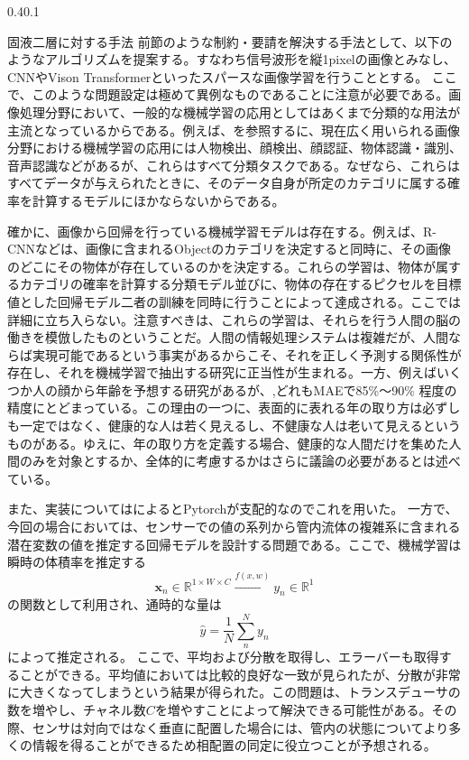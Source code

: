 \documentclass[uplatex]{suribt}
\makeatletter
\renewcommand{\subsection}{%
    \@startsection{subsection}{1}{\z@}%
    {0.4\Cvs}{0.1\Cvs}%
    {\normalfont\normalsize\headfont\raggedright}}
\makeatother
\begin{document}
\subsection{固液二層に対する手法}
前節のような制約・要請を解決する手法として、以下のようなアルゴリズムを提案する。すなわち信号波形を縦1pixelの画像とみなし、CNNやVison Transformerといったスパースな画像学習を行うこととする。
ここで、このような問題設定は極めて異例なものであることに注意が必要である。画像処理分野において、一般的な機械学習の応用としてはあくまで分類的な用法が主流となっているからである。例えば、\cite{Bishop:DeepLearning24}を参照するに、現在広く用いられる画像分野における機械学習の応用には人物検出、顔検出、顔認証、物体認識・識別、音声認識などがあるが、これらはすべて分類タスクである。なぜなら、これらはすべてデータが与えられたときに、そのデータ自身が所定のカテゴリに属する確率を計算するモデルにほかならないからである。\par
確かに、画像から回帰を行っている機械学習モデルは存在する。例えば、R-CNN\cite{girshick2014rich}などは、画像に含まれるObjectのカテゴリを決定すると同時に、その画像のどこにその物体が存在しているのかを決定する。これらの学習は、物体が属するカテゴリの確率を計算する分類モデル並びに、物体の存在するピクセルを目標値とした回帰モデル二者の訓練を同時に行うことによって達成される。ここでは詳細に立ち入らない。注意すべきは、これらの学習は、それらを行う人間の脳の働きを模倣したものということだ。人間の情報処理システムは複雑だが、人間ならば実現可能であるという事実があるからこそ、それを正しく予測する関係性が存在し、それを機械学習で抽出する研究に正当性が生まれる。一方、例えばいくつか人の顔から年齢を予想する研究があるが、\cite{sheoran2020age},\cite{guo2008probabilistic}どれもMAEで85\%～90\% 程度の精度にとどまっている。この理由の一つに、表面的に表れる年の取り方は必ずしも一定ではなく、健康的な人は若く見えるし、不健康な人は老いて見えるというものがある。ゆえに、年の取り方を定義する場合、健康的な人間だけを集めた人間のみを対象とするか、全体的に考慮するかはさらに議論の必要があると\cite{guo2008probabilistic}は述べている。\par
また、実装については\cite{torchvstensor}によるとPytorchが支配的なのでこれを用いた。
一方で、今回の場合においては、センサーでの値の系列から管内流体の複雑系に含まれる潜在変数の値を推定する回帰モデルを設計する問題である。ここで、機械学習は瞬時の体積率を推定する
\begin{equation}
    \mathbf{x}_n \in \mathbb{R}^{1\times W\times C} \stackrel{f(x,w)}{\to} y_n \in \mathbb{R}^1
\end{equation}
の関数として利用され、通時的な量は
\begin{equation}
    \hat y = \frac{1}{N}\sum_n^N y_n
\end{equation}
によって推定される。
ここで、平均および分散を取得し、エラーバーも取得することができる。平均値においては比較的良好な一致が見られたが、分散が非常に大きくなってしまうという結果が得られた。この問題は、トランスデューサの数を増やし、チャネル数$C$を増やすことによって解決できる可能性がある。その際、センサは対向ではなく垂直に配置した場合には、管内の状態についてより多くの情報を得ることができるため相配置の同定に役立つことが予想される。
\end{document}
